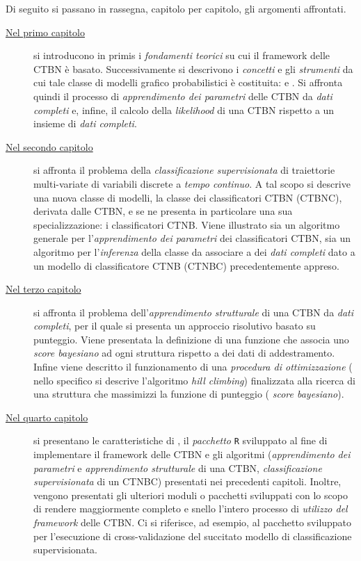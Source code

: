 Di seguito si passano in rassegna, capitolo per capitolo, gli argomenti affrontati.
\begin{description}
	\item[{\hyperref[cap:ctbn]{Nel primo capitolo}}]
	si introducono in primis i \emph{fondamenti teorici} su cui il framework delle \acf{CTBN} è basato. Successivamente si descrivono i \emph{concetti} e gli \emph{strumenti} da cui tale classe di modelli grafico probabilistici è costituita: \emph{\cim{}} e \emph{\stats{}}. Si affronta quindi il processo di \emph{apprendimento dei parametri} delle \acs{CTBN} da \emph{dati completi} e, infine, il calcolo della \emph{likelihood} di una \acs{CTBN} rispetto a un insieme di \emph{dati completi}.
	\item[{\hyperref[cap:ctbnc]{Nel secondo capitolo}}]
	si affronta il problema della \emph{classificazione supervisionata} di traiettorie multi-variate di variabili discrete a \emph{tempo continuo}. A tal scopo si descrive una nuova classe di modelli, la classe dei classificatori \acl{CTBN} (\acs{CTBNC}), derivata dalle \acs{CTBN}, e se ne presenta in particolare una sua specializzazione: i classificatori \acs{CTNB}. Viene illustrato sia un algoritmo generale per l'\emph{apprendimento dei parametri} dei classificatori \acs{CTBN}, sia un algoritmo per l'\emph{inferenza} della classe da associare a dei \emph{dati completi} dato a un modello di classificatore \acs{CTNB} (\acs{CTNBC}) precedentemente appreso.
	\item[{\hyperref[cap:structurallearning]{Nel terzo capitolo}}]
	si affronta il problema dell'\emph{apprendimento strutturale} di una \acs{CTBN} da \emph{dati completi}, per il quale si presenta un approccio risolutivo basato su punteggio. Viene presentata la definizione di una funzione che associa uno \emph{score bayesiano} ad ogni struttura rispetto a dei dati di addestramento. Infine viene descritto il funzionamento di una \emph{procedura di ottimizzazione} (\ie{} nello specifico si descrive l'algoritmo \emph{hill climbing}) finalizzata alla ricerca di una struttura che massimizzi la funzione di punteggio (\ie{} \emph{score bayesiano}).
	\item[{\hyperref[cap:ctbnr]{Nel quarto capitolo}}]
	si presentano le caratteristiche di \rctbn{}, il \emph{pacchetto} \lstinline[]|R| sviluppato al fine di implementare il framework delle \acs{CTBN} e gli algoritmi (\emph{apprendimento dei parametri} e \emph{apprendimento strutturale} di una \acs{CTBN}, \emph{classificazione supervisionata} di un \acs{CTNBC}) presentati nei precedenti capitoli. Inoltre, vengono presentati gli ulteriori moduli o pacchetti sviluppati con lo scopo di rendere maggiormente completo e snello l'intero processo di \emph{utilizzo del framework} delle \acs{CTBN}. Ci si riferisce, ad esempio, al pacchetto sviluppato per l'esecuzione di cross-validazione del succitato modello di classificazione supervisionata.

\end{description}

